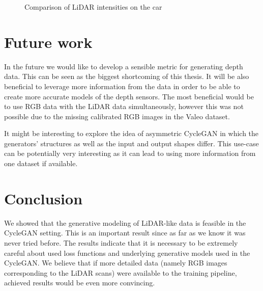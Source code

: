 \begin{figure}
\hfil
{}
\hfil
{}
\caption{Comparison of LiDAR intensities on the car}
\label{carfigs}
\end{figure}

\section{Future work}

In the future we would like to develop a sensible metric for generating depth data. This can be seen as the biggest shortcoming of this thesis. It will be also beneficial to leverage more information from the data in order to be able to create more accurate models of the depth sensors. The most beneficial would be to use RGB data with the LiDAR data simultaneously, however this was not possible due to the missing calibrated RGB images in the Valeo dataset.

It might be interesting to explore the idea of asymmetric CycleGAN in which the generators' structures as well as the input and output shapes differ. This use-case can be potentially very interesting as it can lead to using more information from one dataset if available.

\section{Conclusion}

We showed that the generative modeling of LiDAR-like data is feasible in the CycleGAN setting. This is an important result since as far as we know it was never tried before. The results indicate that it is necessary to be extremely careful about used loss functions and underlying generative models used in the CycleGAN. We believe that if more detailed data (namely RGB images corresponding to the LiDAR scans) were available to the training pipeline, achieved results would be even more convincing.
